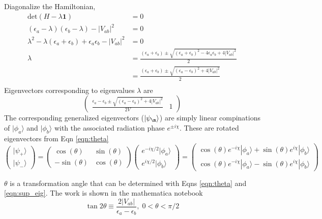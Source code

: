 \documentclass{article}
\begin{document}
Diagonalize the Hamiltonian,
\begin{align}
  \text{det}(H-\lambda\mathbf{1}) &= 0 \\
  (\epsilon_a-\lambda)(\epsilon_b-\lambda) - |V_{ab}|^2 &= 0 \\
  \lambda^2 -\lambda(\epsilon_a+\epsilon_b) + \epsilon_a\epsilon_b
  - |V_{ab}|^2 &= 0 \\
  \lambda &= \frac{(\epsilon_a+\epsilon_b) \pm
    \sqrt{(\epsilon_a+\epsilon_b)^2 -4\epsilon_a\epsilon_b + 4|V_{ab}|^2}}{2}\\
  & = \frac{(\epsilon_a+\epsilon_b) \pm
    \sqrt{(\epsilon_a-\epsilon_b)^2 + 4|V_{ab}|^2}}{2} \nonumber \\
\end{align}
Eigenvectors corresponding to eigenvalues $\lambda$ are
\begin{equation}
  \begin{pmatrix}
    \frac{\epsilon_a-\epsilon_b\pm\sqrt{(\epsilon_a-\epsilon_b)^2+4|V_{ab}|^2}}{2V} & 1
  \end{pmatrix}
  \label{eqn:theta}
\end{equation}
The corresponding generalized eigenvectors ($|\psi_{\m}\rangle$) are simply
linear compinations of $|\phi_a\rangle$ and $|\phi_b\rangle$
with the associated radiation phase $e^{\pm i\chi}$. These are rotated eigenvectors
from Eqn \eqref{eqn:theta}
\begin{equation}
  \begin{pmatrix}
    |\psi_+\rangle \\
    |\psi_-\rangle
  \end{pmatrix}
  =
  \begin{pmatrix}
    \cos(\theta) & \sin(\theta) \\
    -\sin(\theta)& \cos(\theta)
  \end{pmatrix}
  \begin{pmatrix}
    e^{-i\chi/2}|\phi_a\rangle \\
    e^{i\chi/2}|\phi_b\rangle
  \end{pmatrix}
  =\begin{pmatrix}
  \cos(\theta)e^{-i\chi}|\phi_a\rangle + \sin(\theta) e^{i\chi}|\phi_b\rangle \\
  \cos(\theta)e^{-i\chi}|\phi_a\rangle - \sin(\theta) e^{i\chi}|\phi_b\rangle
  \end{pmatrix}
  \label{eqn:sup_eig}
\end{equation}

$\theta$ is a transformation angle that can be determined with Eqns
\eqref{eqn:theta} and \eqref{eqn:sup_eig}. The work is shown in the mathematica
notebook
\begin{equation}
  \tan 2\theta \equiv \frac{2|V_{ab}|}{\epsilon_a-\epsilon_b},\; 0<\theta<\pi/2
\end{equation}
\end{document}

